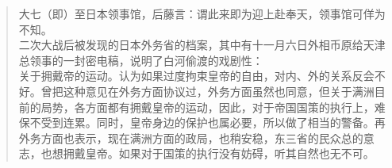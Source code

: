 \begin{quote}
	大七（即）至日本领事馆，后藤言：谓此来即为迎上赴奉天，领事馆可佯为不知。\\

二次大战后被发现的日本外务省的档案，其中有十一月六日外相币原给天津总领事的一封密电稿，说明了白河偷渡的戏剧性：\\

关于拥戴帝的运动。认为如果过度拘束皇帝的自由，对内、外的关系反会不好。曾把这种意见在外务方面协议过，外务方面虽然也同意，但关于满洲目前的局势，各方面都有拥戴皇帝的运动，因此，对于帝国国策的执行上，难保不受到连累。同时，皇帝身边的保护也属必要，所以做了相当的警备。再外务方面也表示，现在满洲方面的政局，也稍安稳，东三省的民众总的意志，也想拥戴皇帝。如果对于国策的执行没有妨碍，听其自然也无不可。\\
\end{quote}
